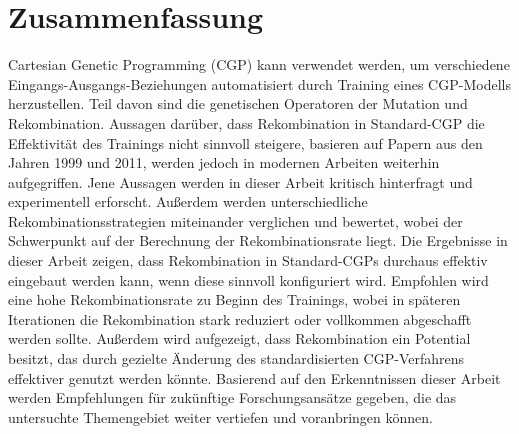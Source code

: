 \section*{Zusammenfassung}

Cartesian Genetic Programming (CGP) kann verwendet werden, um verschiedene Ein\-gangs-Aus\-gangs-Beziehungen automatisiert durch Training eines CGP-Modells herzustellen.
Teil davon sind die genetischen Operatoren der Mutation und Rekombination.
Aussagen darüber, dass Rekombination in Standard-CGP die Effektivität des Trainings nicht sinnvoll steigere, basieren auf Papern aus den Jahren 1999 und 2011, werden jedoch in modernen Arbeiten weiterhin aufgegriffen.
Jene Aussagen werden in dieser Arbeit kritisch hinterfragt und experimentell erforscht.
Außerdem werden unterschiedliche Rekombinationsstrategien miteinander verglichen und bewertet, wobei der Schwerpunkt auf der Berechnung der Rekombinationsrate liegt.
Die Ergebnisse in dieser Arbeit zeigen, dass Rekombination in Standard-CGPs durchaus effektiv eingebaut werden kann, wenn diese sinnvoll konfiguriert wird.
Empfohlen wird eine hohe Rekombinationsrate zu Beginn des Trainings, wobei in späteren Iterationen die Rekombination stark reduziert oder vollkommen abgeschafft werden sollte.
Außerdem wird aufgezeigt, dass Rekombination ein Potential besitzt, das durch gezielte Änderung des standardisierten CGP-Verfahrens effektiver genutzt werden könnte.
Basierend auf den Erkenntnissen dieser Arbeit werden Empfehlungen für zukünftige Forschungsansätze gegeben, die das untersuchte Themengebiet weiter vertiefen und voranbringen können.

